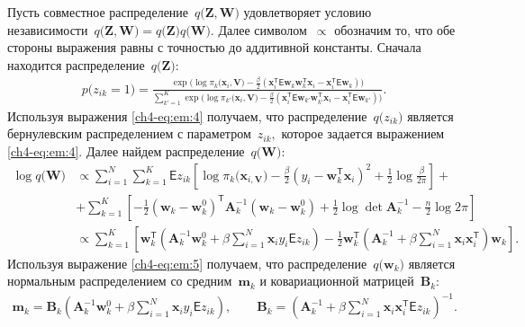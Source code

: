 \documentclass{dissert}
\begin{document}
Пусть совместное распределение~$q\bigr(\mathbf{Z}, \mathbf{W}\bigr)$ удовлетворяет условию независимости~$q\bigr(\mathbf{Z}, \mathbf{W}\bigr) = q\bigr(\mathbf{Z}\bigr)q\bigr(\mathbf{W}\bigr)$. 
Далее символом~$\propto$ обозначим то, что обе стороны выражения равны с точностью до аддитивной константы.
Сначала находится распределение~$q\bigr(\textbf{Z}\bigr)$:
\[
\label{ch4-eq:em:4}
\begin{aligned}
p\bigr(z_{ik} = 1\bigr) = \frac{\exp\bigr(\log\pi_{k}\bigr(\textbf{x}_{i}, \textbf{V}\bigr) - \frac{\beta}{2}\left(\textbf{x}_{i}^{\mathsf{T}}\mathsf{E}\textbf{w}_{k}\textbf{w}_{k}^{\mathsf{T}}\textbf{x}_{i} - \textbf{x}_{i}^{\mathsf{T}}\mathsf{E}\textbf{w}_{k}\right)\bigr)}{\sum_{k'=1}^{K}\exp\bigr(\log\pi_{k'}\bigr(\textbf{x}_{i}, \textbf{V}\bigr) - \frac{\beta}{2}\left(\textbf{x}_{i}^{\mathsf{T}}\mathsf{E}\textbf{w}_{k'}\textbf{w}_{k'}^{\mathsf{T}}\textbf{x}_{i} - \textbf{x}_{i}^{\mathsf{T}}\mathsf{E}\textbf{w}_{k'}\right)\bigr)}.
\end{aligned}
\]
Используя выражения \eqref{ch4-eq:em:4} получаем, что распределение~$q\bigr(z_{ik}\bigr)$ является бернулевским распределением с параметром~$z_{ik},$ которое задается выражением \eqref{ch4-eq:em:4}.
Далее найдем распределение~$q\bigr(\textbf{W}\bigr)$:
\[
\label{ch4-eq:em:5}
\begin{aligned}
\log q\bigr(\textbf{W}\bigr) &\propto \sum_{i=1}^{N}\sum_{k=1}^{K}\mathsf{E}z_{ik}\left[\log\pi_{k}\bigr(\textbf{x}_{i, \textbf{V}}\bigr) - \frac{\beta}{2}\left(y_{i} - \textbf{w}_{k}^{\mathsf{T}}\textbf{x}_{i}\right)^{2} + \frac{1}{2}\log\frac{\beta}{2\pi}\right] + \\
&+ \sum_{k=1}^{K}\left[-\frac{1}{2}\left(\textbf{w}_{k} - \textbf{w}_{k}^{0}\right)^{\mathsf{T}}\textbf{A}_{k}^{-1}\left(\textbf{w}_{k} - \textbf{w}_{k}^{0}\right) + \frac{1}{2}\log\det\textbf{A}^{-1}_{k} - \frac{n}{2}\log2\pi\right] \\
&\propto \sum_{k=1}^{K}\left[\textbf{w}_{k}^{\mathsf{T}}\left(\textbf{A}_{k}^{-1}\textbf{w}_{k}^{0}+\beta\sum_{i=1}^{N}\textbf{x}_{i}y_{i}\mathsf{E}z_{ik}\right)-\frac{1}{2}\textbf{w}_{k}^{\mathsf{T}}\left(\textbf{A}_{k}^{-1}+\beta\sum_{i=1}^{N}\textbf{x}_{i}\textbf{x}_{i}^{\mathsf{T}}\right)\textbf{w}_{k}\right].
\end{aligned}
\]
Используя выражение \eqref{ch4-eq:em:5} получаем, что  распределение~$q\bigr(\mathbf{w}_{k}\bigr)$ является нормальным распределением со средним~$\mathbf{m}_{k}$ и ковариационной матрицей~$\mathbf{B}_k$:
\[
\label{ch4-eq:em:6}
\begin{aligned}
\mathbf{m}_{k} = \mathbf{B}_{k}\left(\mathbf{A}_{k}^{-1}\mathbf{w}_{k}^{0}+\beta\sum_{i=1}^{N}\mathbf{x}_{i}y_{i}\mathsf{E}z_{ik}\right), \qquad \mathbf{B}_{k} = \left(\mathbf{A}_{k}^{-1}+\beta\sum_{i=1}^{N}\mathbf{x}_{i}\mathbf{x}_{i}^{\mathsf{T}}\mathsf{E}z_{ik}\right)^{-1}.
\end{aligned}
\]
\end{document}
